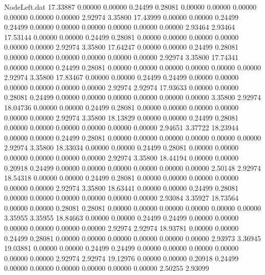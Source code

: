 \begin{filecontents}{NodeLeft.dat}
  17.33887    0.00000    0.00000     0.24499    0.28081    0.00000    0.00000    0.00000    0.00000    0.00000    0.00000    2.92974    3.35800
  17.43999    0.00000    0.00000     0.24499    0.24499    0.00000    0.00000    0.00000    0.00000    0.00000    0.00000    2.93464    2.93464
  17.53144    0.00000    0.00000     0.24499    0.28081    0.00000    0.00000    0.00000    0.00000    0.00000    0.00000    2.92974    3.35800
  17.64247    0.00000    0.00000     0.24499    0.28081    0.00000    0.00000    0.00000    0.00000    0.00000    0.00000    2.92974    3.35800
  17.74341    0.00000    0.00000     0.24499    0.28081    0.00000    0.00000    0.00000    0.00000    0.00000    0.00000    2.92974    3.35800
  17.83467    0.00000    0.00000     0.24499    0.24499    0.00000    0.00000    0.00000    0.00000    0.00000    0.00000    2.92974    2.92974
  17.93633    0.00000    0.00000     0.28081    0.24499    0.00000    0.00000    0.00000    0.00000    0.00000    0.00000    3.35800    2.92974
  18.04736    0.00000    0.00000     0.24499    0.28081    0.00000    0.00000    0.00000    0.00000    0.00000    0.00000    2.92974    3.35800
  18.13829    0.00000    0.00000     0.24499    0.28081    0.00000    0.00000    0.00000    0.00000    0.00000    0.00000    2.94651    3.37722
  18.23944    0.00000    0.00000     0.24499    0.28081    0.00000    0.00000    0.00000    0.00000    0.00000    0.00000    2.92974    3.35800
  18.33034    0.00000    0.00000     0.24499    0.28081    0.00000    0.00000    0.00000    0.00000    0.00000    0.00000    2.92974    3.35800
  18.44194    0.00000    0.00000     0.20918    0.24499    0.00000    0.00000    0.00000    0.00000    0.00000    0.00000    2.50148    2.92974
  18.54318    0.00000    0.00000     0.24499    0.28081    0.00000    0.00000    0.00000    0.00000    0.00000    0.00000    2.92974    3.35800
  18.63441    0.00000    0.00000     0.24499    0.28081    0.00000    0.00000    0.00000    0.00000    0.00000    0.00000    2.93084    3.35927
  18.73564    0.00000    0.00000     0.28081    0.28081    0.00000    0.00000    0.00000    0.00000    0.00000    0.00000    3.35955    3.35955
  18.84663    0.00000    0.00000     0.24499    0.24499    0.00000    0.00000    0.00000    0.00000    0.00000    0.00000    2.92974    2.92974
  18.93781    0.00000    0.00000     0.24499    0.28081    0.00000    0.00000    0.00000    0.00000    0.00000    0.00000    2.93973    3.36945
  19.03881    0.00000    0.00000     0.24499    0.24499    0.00000    0.00000    0.00000    0.00000    0.00000    0.00000    2.92974    2.92974
  19.12976    0.00000    0.00000     0.20918    0.24499    0.00000    0.00000    0.00000    0.00000    0.00000    0.00000    2.50255    2.93099

\end{filecontents}
